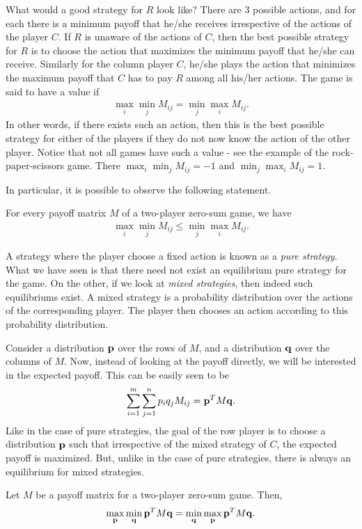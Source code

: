 What would a good strategy for $R$ look like? There are $3$ possible actions, and for each there is a minimum payoff that he/she receives irrespective of the actions of the player $C$. If $R$ is unaware of the actions of $C$, then the best possible strategy for $R$ is to choose the action that maximizes the minimum payoff that he/she can receive. Similarly for the column player $C$, he/she plays the action that minimizes the maximum payoff that $C$ has to pay $R$ among all his/her actions. The game is said to have a value if 
\begin{align*}
	\max_{i} \min_{j} M_{ij} = \min_{j} \max_{i} M_{ij}.
\end{align*}
In other words, if there exists such an action, then this is the best possible strategy for either of the players if they do not now know the action of the other player. Notice that not all games have such a value - see the example of the rock-paper-scissors game. There $\max_{i} \min_{j} M_{ij} = -1$ and $\min_{j} \max_{i} M_{ij} = 1$.

In particular, it is possible to observe the following statement.
\begin{lemma}
	For every payoff matrix $M$ of a two-player zero-sum game, we have
	\begin{align*}
		\max_{i} \min_{j} M_{ij} \leq \min_{j} \max_{i} M_{ij}.
	\end{align*}
	\label{lem:pure-strat}
\end{lemma}

A strategy where the player choose a fixed action is known as a \emph{pure strategy}. What we have seen is that there need not exist an equilibrium pure strategy for the game. On the other, if we look at \emph{mixed strategies}, then indeed such equilibriums exist. A mixed strategy is a probability distribution over the actions of the corresponding player. The player then chooses an action according to this probability distribution. 

Consider a distribution $\mathbf{p}$ over the rows of $M$, and a distribution $\mathbf{q}$ over the columns of $M$. Now, instead of looking at the payoff directly, we will be interested in the expected payoff. This can be easily seen to be
\begin{align*}
	\sum_{i=1}^m \sum_{j=1}^n p_i q_j M_{ij} = \mathbf{p}^TM\mathbf{q}.
\end{align*}
Like in the case of pure strategies, the goal of the row player is to choose a distribution $\mathbf{p}$ such that irrespective of the mixed strategy of $C$, the expected payoff is maximized. But, unlike in the case of pure strategies, there is always an equilibrium for mixed strategies. 
\begin{theorem}
	Let $M$ be a payoff matrix for a two-player zero-sum game. Then,
	\begin{align*}
		\max_{\mathbf{p}} \min_{\mathbf{q}} \mathbf{p}^T M \mathbf{q} = \min_{\mathbf{q}} \max_{\mathbf{p}} \mathbf{p}^TM\mathbf{q}.
	\end{align*}
	\label{thm:vn-minimax}
\end{theorem}

